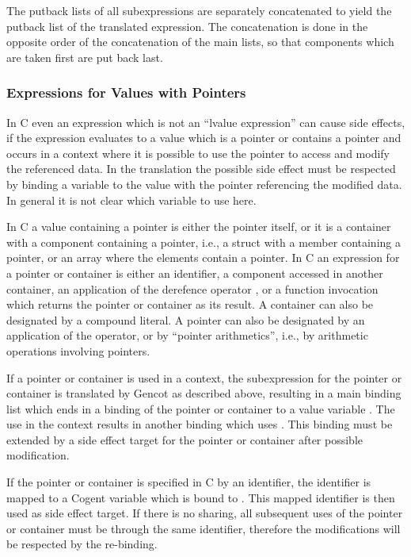The putback lists of all subexpressions are separately concatenated to yield the putback list of the translated expression.
The concatenation is done in the opposite order of the concatenation of the main lists, so that components which are taken
first are put back last.

\subsubsection{Expressions for Values with Pointers}

In C even an expression which is not an ``lvalue expression'' can cause side effects, if the expression evaluates to a 
value which is a pointer or contains a pointer and occurs in a context where it is possible to use the pointer to access 
and modify the referenced data. In the translation the possible side effect must be respected by binding a variable to the 
value with the pointer referencing the modified data. In general it is not clear which variable to use here.

In C a value containing a pointer is either the pointer itself, or it is a container with a component containing a pointer,
i.e., a struct with a member containing a pointer, or an array where the elements contain a pointer. In C an expression
for a pointer or container is either an identifier, a component accessed in another container, an application of the derefence
operator \code{*}, or a function invocation which 
returns the pointer or container as its result. A container can also be designated by a compound literal. A pointer can also
be designated by an application of the \code{\&} operator, or by ``pointer arithmetics'', i.e., by arithmetic operations 
involving pointers.

If a pointer or container is used in a context, the subexpression for the pointer or container is translated by Gencot as 
described above, resulting in a main binding list which ends in a binding of the pointer or container to a value
variable . The use in the context results in another binding which uses .
This binding must be extended by a side effect target for the pointer or container after possible modification. 

If the pointer or container is specified in C by an identifier, the identifier is mapped to a Cogent variable 
which is bound to . This mapped identifier is then used as side effect target. If there is no sharing, all 
subsequent uses of the pointer or container must be through the same identifier, therefore the modifications will be
respected by the re-binding.

